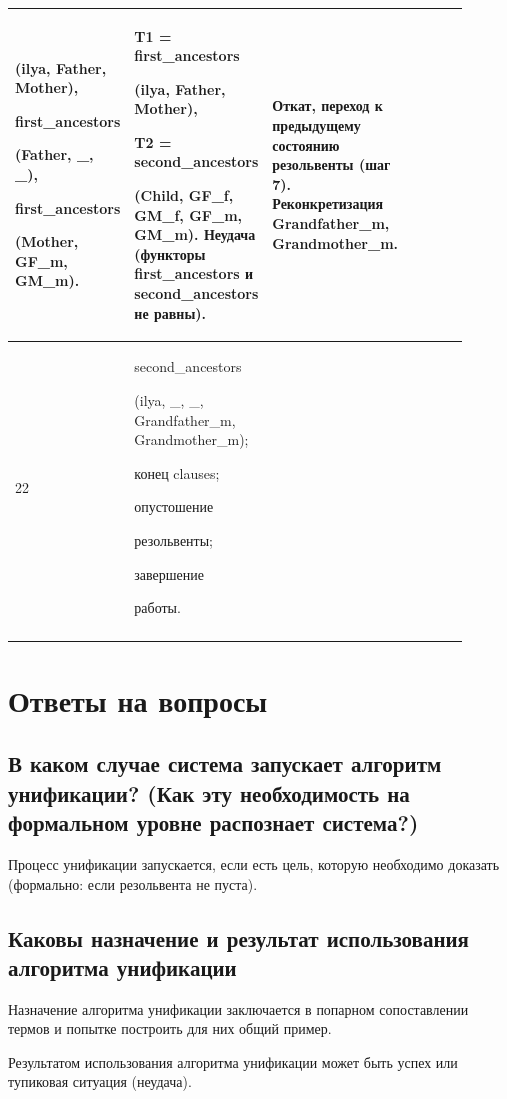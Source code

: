 \documentclass[a4paper,12pt]{article}
\begin{document}
\begin{center}
\begin{longtable}[h!]{|p{0.05\linewidth}|p{0.25\linewidth}|p{ 0.3\linewidth}|p{ 0.3\linewidth}|}
{				(ilya, Father, Mother),
				
				first\_ancestors
				
				(Father, \_, \_),
				
				first\_ancestors
				
				(Mother, GF\_m, GM\_m).} & {T1 = first\_ancestors
				
				(ilya, Father, Mother),
				
				T2 = second\_ancestors
				
				(Child, GF\_f, GM\_f, GF\_m, GM\_m). Неудача (функторы first\_ancestors и second\_ancestors не равны).} & {Откат, переход к предыдущему состоянию резольвенты (шаг 7). Реконкретизация Grandfather\_m, Grandmother\_m.}\\
			\hline
			{22} & {second\_ancestors
				
				(ilya, \_, \_, Grandfather\_m, Grandmother\_m);
			
		конец clauses;
	
опустошение 

резольвенты;

завершение

работы.} & {} & {}\\
			\hline
			\label{m2}
		\end{longtable}
	\end{center}
	
	\section*{Ответы на вопросы}
	
	\subsection*{В каком случае система запускает алгоритм унификации? (Как эту необходимость на формальном уровне распознает система?)}
	
	Процесс унификации запускается, если есть цель, которую необходимо доказать (формально: если резольвента не пуста).
	
	\subsection*{Каковы назначение и результат использования алгоритма унификации}
	
	Назначение алгоритма унификации заключается в попарном сопоставлении термов и попытке построить для них общий пример. 
	
	Результатом использования алгоритма унификации может быть успех или тупиковая ситуация (неудача).
	
\end{document}
